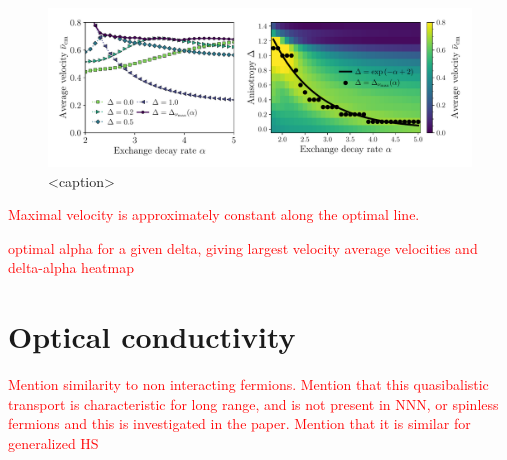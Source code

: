 \begin{figure}[htbp]
  \centering
  \includegraphics[width=\linewidth]{Figures/optimal_velocity.pdf}
  \caption{<caption>}
  \label{<label>}
\end{figure}



\textcolor{red}{Maximal velocity is approximately constant along the optimal line.}

\textcolor{red}{optimal alpha for a given delta, giving largest velocity}
\textcolor{red}{average velocities and delta-alpha heatmap}



\section{Optical conductivity}






\textcolor{red}{Mention similarity to non interacting fermions.}
\textcolor{red}{Mention that this quasibalistic transport is characteristic for long range,
and is not present in NNN, or spinless fermions and this is investigated in the paper.}
\textcolor{red}{Mention that it is similar for generalized HS}